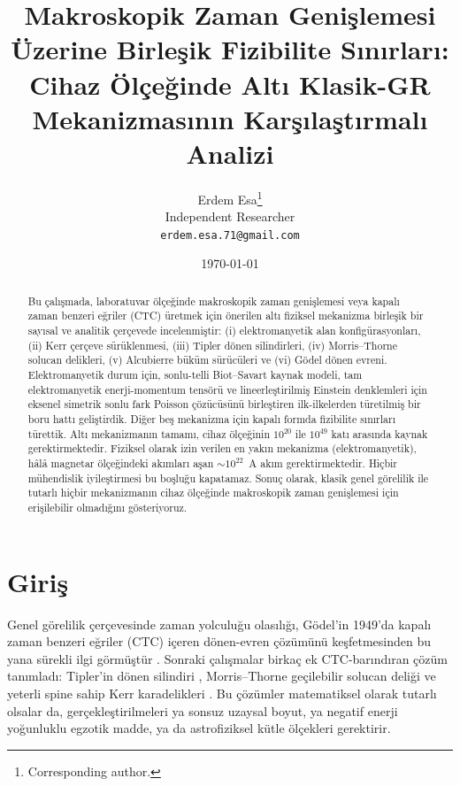 \documentclass[11pt,a4paper,twocolumn]{article}
\title{Makroskopik Zaman Genişlemesi Üzerine Birleşik Fizibilite Sınırları:\\Cihaz Ölçeğinde Altı Klasik-GR Mekanizmasının Karşılaştırmalı Analizi}
\author{Erdem Esa\thanks{Corresponding author.}\\ \small Independent Researcher\\ \small \texttt{erdem.esa.71@gmail.com}}
\date{\today}
\begin{document}
\maketitle
{}
\begin{abstract}
Bu \c{c}al\i{}\c{s}mada, laboratuvar \"ol\c{c}e\u{g}inde makroskopik
zaman geni\c{s}lemesi veya kapal\i{} zaman benzeri e\u{g}riler
(CTC) \"uretmek i\c{c}in \"onerilen alt\i{} fiziksel mekanizma
birle\c{s}ik bir say\i{}sal ve analitik \c{c}er\c{c}evede
incelenmi\c{s}tir: (i) elektromanyetik alan konfig\"urasyonlar\i{},
(ii) Kerr \c{c}er\c{c}eve s\"ur\"uklenmesi, (iii) Tipler d\"onen
silindirleri, (iv) Morris--Thorne solucan delikleri, (v) Alcubierre
b\"uk\"um s\"ur\"uc\"uleri ve (vi) G\"odel d\"onen evreni.
Elektromanyetik durum i\c{c}in, sonlu-telli Biot--Savart kaynak
modeli, tam elektromanyetik enerji-momentum tens\"or\"u ve
lineerle\c{s}tirilmi\c{s} Einstein denklemleri i\c{c}in eksenel
simetrik sonlu fark Poisson \c{c}\"oz\"uc\"us\"un\"u birle\c{s}tiren
ilk-ilkelerden t\"uretilmi\c{s} bir boru hatt\i{} geli\c{s}tirdik.
Di\u{g}er be\c{s} mekanizma i\c{c}in kapal\i{} formda
fizibilite s\i{}n\i{}rlar\i{} t\"urettik. Alt\i{} mekanizman\i{}n
tamam\i{}, cihaz \"ol\c{c}e\u{g}inin $10^{20}$ ile $10^{49}$ kat\i{}
aras\i{}nda kaynak gerektirmektedir. Fiziksel olarak izin verilen
en yak\i{}n mekanizma (elektromanyetik), h\^al\^a magnetar
\"ol\c{c}e\u{g}indeki ak\i{}mlar\i{} a\c{s}an $\sim 10^{22}$~A
ak\i{}m gerektirmektedir. Hi\c{c}bir m\"uhendislik iyile\c{s}tirmesi
bu bo\c{s}lu\u{g}u kapatamaz. Sonu\c{c} olarak, klasik genel
g\"orelilik ile tutarl\i{} hi\c{c}bir mekanizman\i{}n cihaz
\"ol\c{c}e\u{g}inde makroskopik zaman geni\c{s}lemesi i\c{c}in
eri\c{s}ilebilir olmad\i{}\u{g}\i{}n\i{} g\"osteriyoruz.

\end{abstract}


\section{Giriş}
\label{sec:intro}

Genel görelilik çerçevesinde zaman yolculuğu olasılığı, Gödel'in
1949'da kapalı zaman benzeri eğriler (CTC) içeren dönen-evren
çözümünü keşfetmesinden bu yana sürekli ilgi görmüştür
\citep{Godel1949}. Sonraki çalışmalar birkaç ek CTC-barındıran çözüm
tanımladı: Tipler'in dönen silindiri \citep{Tipler1974},
Morris--Thorne geçilebilir solucan deliği \citep{MorrisThorne1988}
ve yeterli spine sahip Kerr karadelikleri \citep{Kerr1963}. Bu
çözümler matematiksel olarak tutarlı olsalar da, gerçekleştirilmeleri
ya sonsuz uzaysal boyut, ya negatif enerji yoğunluklu egzotik madde,
ya da astrofiziksel kütle ölçekleri gerektirir.
\end{document}
